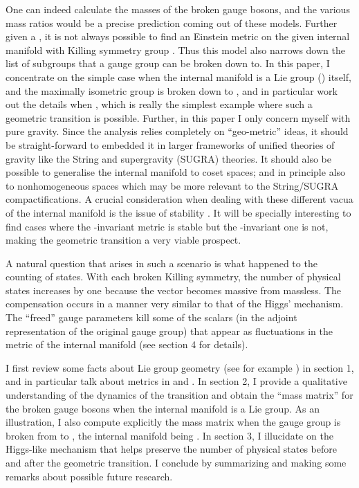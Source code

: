 \documentclass[a4paper,12pt]{article}
\begin{document}
One can indeed calculate the masses of the broken gauge bosons, and the various mass ratios would be a precise prediction coming out of these models. Further given a  \coordHE{}, it is not always possible to find an Einstein metric on the given internal manifold with Killing symmetry group \coordHE{}. Thus this model also narrows down the list of subgroups that a gauge group can be broken down to. In this paper, I concentrate on the simple case when the internal manifold is a Lie group (\coordHE{}) itself, and the maximally isometric group \coordHE{} is broken down to \coordHE{}, \coordHE{} and in particular work out the details when \coordHE{}, which is really the simplest example where such a  geometric transition is possible. Further, in this paper I only concern myself with pure gravity. Since the analysis relies completely on ``geo-metric'' ideas, it should be straight-forward to embedded it in larger frameworks of unified  theories of gravity like the String and supergravity (SUGRA) theories. It should also be possible to generalise the internal manifold to coset spaces; and in principle also to nonhomogeneous spaces which may be more relevant to the String/SUGRA compactifications. A crucial consideration when dealing with these different vacua of the  internal manifold is the issue of stability \cite{stability}.  It will be specially interesting to find cases where the \coordHE{}-invariant  metric is stable but the \coordHE{}-invariant  one is not, making the geometric transition a very viable prospect. 

A natural question that arises in such a scenario is what happened to the counting of states. With each broken Killing symmetry, the number of physical states increases by one because the vector becomes massive from massless. The compensation occurs in a manner very similar to that of the Higgs' mechanism. The ``freed'' gauge parameters kill some of the scalars (in the adjoint representation of the original gauge group) that appear as fluctuations in the metric of the internal manifold (see section 4 for details). 

I first review some facts about Lie group geometry (see for example \cite{liegroup}) in section 1, and in particular talk about metrics in \coordHE{} and \coordHE{}. In section 2, I provide a qualitative understanding of the dynamics of the transition and obtain the ``mass matrix'' for the broken gauge bosons when the internal manifold is a Lie group. As an illustration, I also compute explicitly the mass matrix when the gauge group is broken from \coordHE{} to \coordHE{}, the internal manifold being  \coordHE{}. In section 3, I illucidate on the Higgs-like mechanism that helps preserve the number of physical states before and after the geometric transition. I conclude by summarizing and making some remarks about possible future research.
  
\end{document}
